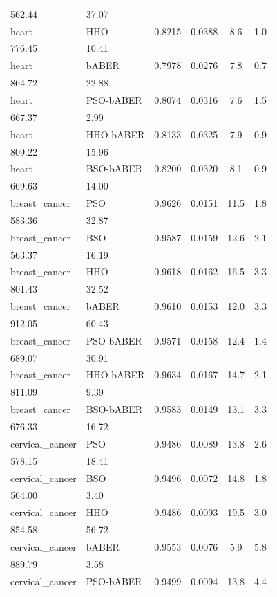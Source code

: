 \begin{table}[htbp]
\begin{tabular}{llcccc}
562.44 & 37.07 \\
heart & HHO & 0.8215 & 0.0388 & 8.6 & 1.0 \\
776.45 & 10.41 \\
heart & bABER & 0.7978 & 0.0276 & 7.8 & 0.7 \\
864.72 & 22.88 \\
heart & PSO-bABER & 0.8074 & 0.0316 & 7.6 & 1.5 \\
667.37 & 2.99 \\
heart & HHO-bABER & 0.8133 & 0.0325 & 7.9 & 0.9 \\
809.22 & 15.96 \\
heart & BSO-bABER & 0.8200 & 0.0320 & 8.1 & 0.9 \\
669.63 & 14.00 \\
\hline
breast_cancer & PSO & 0.9626 & 0.0151 & 11.5 & 1.8 \\
583.36 & 32.87 \\
breast_cancer & BSO & 0.9587 & 0.0159 & 12.6 & 2.1 \\
563.37 & 16.19 \\
breast_cancer & HHO & 0.9618 & 0.0162 & 16.5 & 3.3 \\
801.43 & 32.52 \\
breast_cancer & bABER & 0.9610 & 0.0153 & 12.0 & 3.3 \\
912.05 & 60.43 \\
breast_cancer & PSO-bABER & 0.9571 & 0.0158 & 12.4 & 1.4 \\
689.07 & 30.91 \\
breast_cancer & HHO-bABER & 0.9634 & 0.0167 & 14.7 & 2.1 \\
811.09 & 9.39 \\
breast_cancer & BSO-bABER & 0.9583 & 0.0149 & 13.1 & 3.3 \\
676.33 & 16.72 \\
\hline
cervical_cancer & PSO & 0.9486 & 0.0089 & 13.8 & 2.6 \\
578.15 & 18.41 \\
cervical_cancer & BSO & 0.9496 & 0.0072 & 14.8 & 1.8 \\
564.00 & 3.40 \\
cervical_cancer & HHO & 0.9486 & 0.0093 & 19.5 & 3.0 \\
854.58 & 56.72 \\
cervical_cancer & bABER & 0.9553 & 0.0076 & 5.9 & 5.8 \\
889.79 & 3.58 \\
cervical_cancer & PSO-bABER & 0.9499 & 0.0094 & 13.8 & 4.4 \\

\end{tabular}
\end{table}
